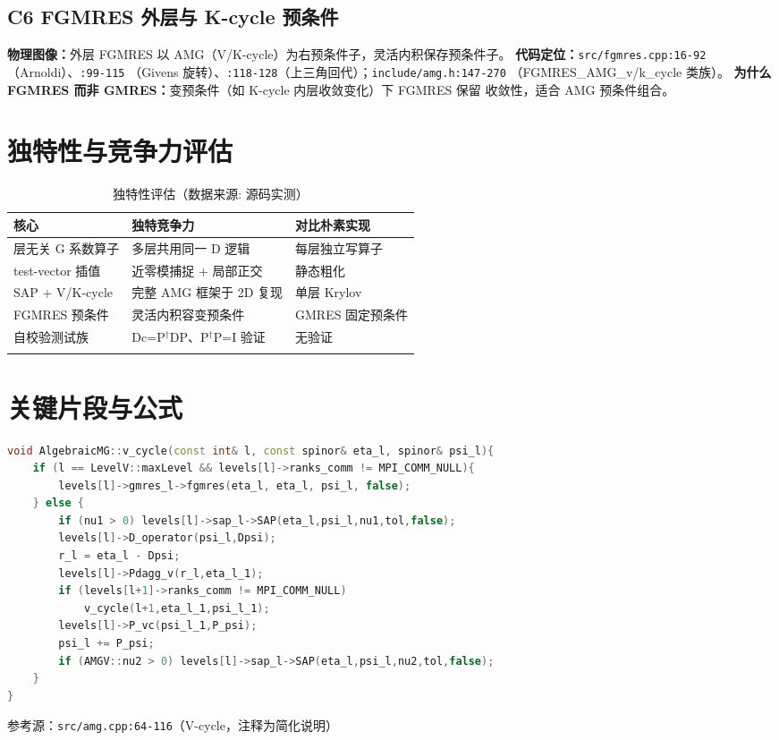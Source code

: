 \documentclass[UTF8]{ctexart}
\begin{document}
\subsection{C6 FGMRES 外层与 K-cycle 预条件}
\textbf{物理图像：}外层 FGMRES 以 AMG（V/K-cycle）为右预条件子，灵活内积保存预条件子。
\textbf{代码定位：}\texttt{src/fgmres.cpp:16-92}（Arnoldi）、\texttt{:99-115}
（Givens 旋转）、\texttt{:118-128}（上三角回代）；\texttt{include/amg.h:147-270}
（FGMRES\_AMG\_v/k\_cycle 类族）。
\textbf{为什么 FGMRES 而非 GMRES：}变预条件（如 K-cycle 内层收敛变化）下 FGMRES 保留
收敛性，适合 AMG 预条件组合。

\section{独特性与竞争力评估}
\begin{xltabular}{\textwidth}{lXX}
\toprule
\textcolor{algo}{核心} & 独特竞争力 & 对比朴素实现 \\
\midrule
\endhead
层无关 G 系数算子 & 多层共用同一 D 逻辑 & 每层独立写算子 \\
test-vector 插值 & 近零模捕捉 + 局部正交 & 静态粗化 \\
SAP + V/K-cycle & 完整 AMG 框架于 2D 复现 & 单层 Krylov \\
FGMRES 预条件 & 灵活内积容变预条件 & GMRES 固定预条件 \\
自校验测试族 & Dc=P$^\dagger$DP、P$^\dagger$P=I 验证 & 无验证 \\
\bottomrule
\caption{独特性评估（数据来源: 源码实测）}
\end{xltabular}

\section{关键片段与公式}
\begin{lstlisting}[language=C++]
void AlgebraicMG::v_cycle(const int& l, const spinor& eta_l, spinor& psi_l){
	if (l == LevelV::maxLevel && levels[l]->ranks_comm != MPI_COMM_NULL){
		levels[l]->gmres_l->fgmres(eta_l, eta_l, psi_l, false);
	} else {
		if (nu1 > 0) levels[l]->sap_l->SAP(eta_l,psi_l,nu1,tol,false);
		levels[l]->D_operator(psi_l,Dpsi);
		r_l = eta_l - Dpsi;
		levels[l]->Pdagg_v(r_l,eta_l_1);
		if (levels[l+1]->ranks_comm != MPI_COMM_NULL)
			v_cycle(l+1,eta_l_1,psi_l_1);
		levels[l]->P_vc(psi_l_1,P_psi);
		psi_l += P_psi;
		if (AMGV::nu2 > 0) levels[l]->sap_l->SAP(eta_l,psi_l,nu2,tol,false);
	}
}
\end{lstlisting}
参考源：\texttt{src/amg.cpp:64-116}（V-cycle，注释为简化说明）
\end{document}
